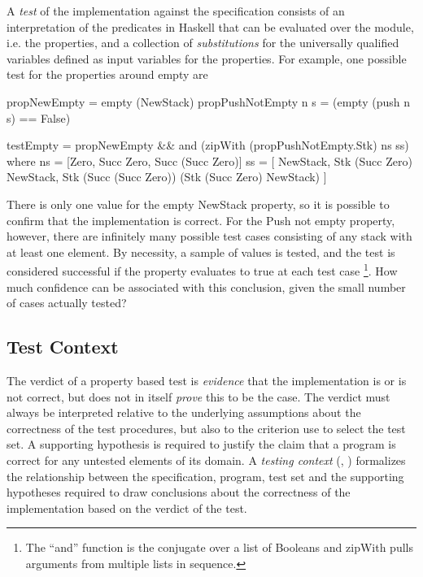 A \emph{test} of the implementation against the specification 
consists of an interpretation of the predicates in Haskell 
that can be evaluated over the module, i.e. the properties,
and a collection of \emph{substitutions} for
the universally qualified variables defined as input variables
for the properties.
For example, one possible test for the properties around empty are

\begin{code}
propNewEmpty = empty (NewStack)
propPushNotEmpty n s  = (empty (push n s) == False)

testEmpty = propNewEmpty
    && and (zipWith (propPushNotEmpty.Stk) ns ss)
    where ns = [Zero, Succ Zero, Succ (Succ Zero)]
                 ss = [ NewStack, Stk (Succ Zero) NewStack, Stk (Succ (Succ Zero)) (Stk (Succ Zero) NewStack) ]
                 
\end{code}

\noindent There is only one value for the empty NewStack property,
so it is possible to confirm that the implementation is correct.
For the Push not empty property, however,
there are infinitely many possible test cases consisting of 
any stack with at least one element.
By necessity, a sample of values is tested,
and the test is considered successful if
the property evaluates to true at each test case
\footnote{The ``and'' function is the conjugate over a list of Booleans
and zipWith pulls arguments from multiple lists in sequence.}.
How much confidence can be associated with this conclusion,
given the small number of cases actually tested?

\subsection{ Test Context }\label{sub:context}

The verdict of a property based test
is \emph{evidence} that the implementation is or is not correct,
but does not in itself \emph{prove} this to be the case.
The verdict must always be interpreted relative to
the underlying assumptions about the correctness of the test procedures,
but also to the criterion use to select the test set.
A supporting hypothesis is required to justify 
the claim that a program is correct for any untested elements of its domain.
A \emph{testing context} (\cite{BernotGaudelMarre1991}, \cite{Bernot1991})
formalizes the relationship between
the specification, program, test set and the supporting hypotheses required
to draw conclusions about the correctness of the implementation
based on the verdict of the test.

